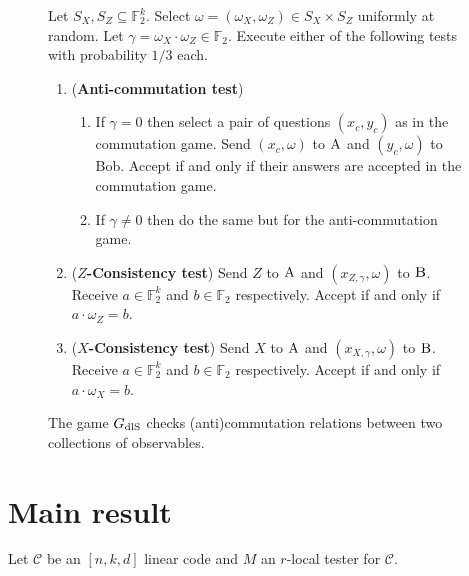 \documentclass[11pt]{article}
\theoremstyle{definition}
\newcommand{\code}{\mathcal{C}}
\newcommand{\field}{\mathbb{F}_2}
\newcommand{\dlS}{\ensuremath{\rm dlS}}
\newcommand{\labelstyle}[1]{\ensuremath{\textsc{#1}}\xspace}
\newcommand{\alice}{\labelstyle{A}}
\newcommand{\bob}{\labelstyle{B}}
\newenvironment{gamespec}{
  \begin{mdframed}[style=figstyle]}{
  \end{mdframed}}
\begin{document}
\begin{figure}[!htbp]
  \centering
  \begin{gamespec}
Let $S_X,S_Z\subseteq \field^k$.  Select $\omega = (\omega_X,\omega_Z)\in S_X \times S_Z $ uniformly at random. Let $\gamma = \omega_X \cdot \omega_Z \in \field$. Execute either of the following tests with probability $1/3$ each. 
    \begin{enumerate}
      \setlength\itemsep{1pt}
    \item (\textbf{Anti-commutation test}) 
		\begin{enumerate}
		\item If $\gamma=0$ then select a pair of questions $(x_c,y_c)$ as in the commutation game. Send $(x_c,\omega)$ to $\alice$ and $(y_c,\omega)$ to Bob. Accept if and only if their answers are accepted in the commutation game. 
		\item If $\gamma\neq 0$ then do the same but for the anti-commutation game. 
		\end{enumerate} 
		 \item (\textbf{$Z$-Consistency test}) Send $Z$ to $\alice$ and $(x_{Z,\gamma},\omega)$ to $\bob$. Receive $a\in \field^k$ and $b\in \field$ respectively. Accept if and only if $a\cdot \omega_Z=b$. 
		 \item (\textbf{$X$-Consistency test}) Send $X$ to $\alice$ and $(x_{X,\gamma},\omega)$ to $\bob$. Receive $a\in \field^k$ and $b\in \field$ respectively. Accept if and only if $a\cdot \omega_X=b$. 
    \end{enumerate}
  \end{gamespec}
  \caption{The game $G_{\dlS}$ checks (anti)commutation relations between two collections of observables.}
  \label{fig:dlS}
\end{figure}

\section{Main result}

Let $\code$ be an $[n,k,d]$ linear code and $M$ an $r$-local tester for $\code$. 
\end{document}
